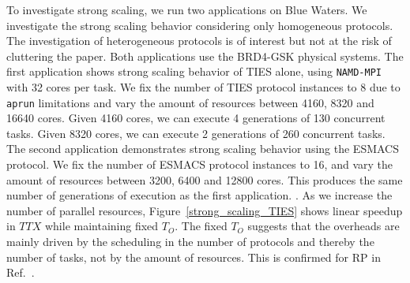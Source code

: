 To investigate strong scaling, we run two applications on Blue Waters. We
investigate the strong scaling behavior considering only homogeneous
protocols. The investigation of heterogeneous protocols is of interest but
not at the risk of cluttering the paper. Both applications use the BRD4-GSK
physical systems. The first application shows strong scaling behavior of TIES
alone, using \texttt{NAMD-MPI} with 32 cores per task. We fix the number of
TIES protocol instances to 8 due to \texttt{aprun} limitations and vary the
amount of resources between 4160, 8320 and 16640 cores. Given 4160 cores, we
can execute 4 generations of 130 concurrent tasks. Given 8320 cores, we can
execute 2 generations of 260 concurrent tasks. The second application
demonstrates strong scaling behavior using the ESMACS protocol. We fix the
number of ESMACS protocol instances to 16, and vary the amount of resources
between 3200, 6400 and 12800 cores. This produces the same number of
generations of execution as the first application. . As we increase the number of
parallel resources, Figure~\ref{strong_scaling_TIES} shows linear speedup in
\(TTX\) while maintaining fixed $T_{O}$. The fixed $T_{O}$ suggests that the
overheads are mainly driven by the scheduling in the number of protocols and
thereby the number of tasks, not by the amount of resources. This is
confirmed for RP in Ref.~\cite{merzky2018}.




